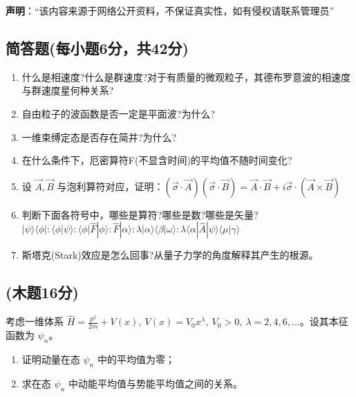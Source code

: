
\textbf{声明}：“该内容来源于网络公开资料，不保证真实性，如有侵权请联系管理员”

\subsection{简答题(每小题6分，共42分)}
\begin{enumerate}
\item 什么是相速度?什么是群速度?对于有质量的微观粒子，其德布罗意波的相速度与群速度星何种关系?
\item 自由粒子的波函数是否一定是平面波?为什么?
\item 一维束缚定态是否存在简并?为什么?
\item 在什么条件下，厄密算符F(不显含时间)的平均值不随时间变化?
\item 设 $\vec{A}, \vec{B}$ 与泡利算符对应，证明：$\left( \vec{\sigma} \cdot \vec{A} \right) \left( \vec{\sigma} \cdot \vec{B} \right) = \vec{A} \cdot \vec{B} + i \vec{\sigma} \cdot \left( \vec{A} \times \vec{B} \right)$
\item 判断下面各符号中，哪些是算符?哪些是数?哪些是矢量?
$|\psi\rangle\langle\phi| : \langle\phi|\psi\rangle : \langle\phi|\hat{F}|\phi\rangle : \hat{F}|\alpha\rangle : \lambda |\alpha\rangle\langle\beta|\omega\rangle : \lambda \langle\alpha|\hat{A}|\psi\rangle\langle\mu|\gamma\rangle$
\item 斯塔克(Stark)效应是怎么回事?从量子力学的角度解释其产生的根源。
\end{enumerate}
\subsection{(木题16分)}
考虑一维体系 $\hat H = \frac{p^2}{2m} + V(x),\ V(x) = V_0 x^\lambda,\ V_0 > 0,\ \lambda = 2, 4, 6, \ldots$。设其本征函数为 $\psi_n$。
\begin{enumerate}
\item 证明动量在态 $\psi_n$ 中的平均值为零；
\item 求在态 $\psi_n$ 中动能平均值与势能平均值之间的关系。
\end{enumerate}
